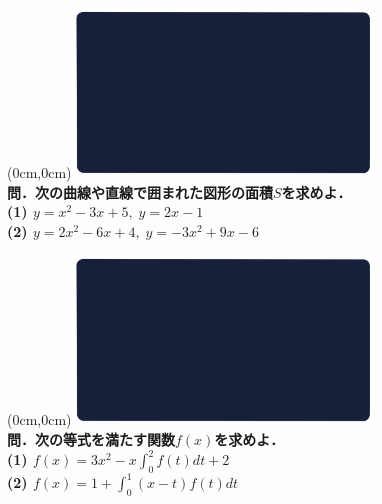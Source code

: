 \documentclass[10pt,
fleqn,
dvipdfmx,
uplatex
]{jsarticle}
\begin{document}
\newpage



\at(0cm,0cm){\includegraphics[width=8cm,bb=0 0 1920 1080]{./media_local/smart_background/数II微積.jpeg}}
\vspace{0.3zw}\\
\noindent\large 
\bf\boldmath 問．次の曲線や直線で囲まれた図形の面積$S$を求めよ．\\
(1)  $y=x^2-3x+5,\;y=2x-1$\\
(2)  $y=2x^2-6x+4,\;y=-3x^2+9x-6$\\



\newpage



\at(0cm,0cm){\includegraphics[width=8cm,bb=0 0 1920 1080]{./media_local/smart_background/数II微積.jpeg}}
\vspace{0.3zw}\\
\noindent\large 
\bf\boldmath 問．次の等式を満たす関数$f\left(x\right)$を求めよ．\\
(1)  $f\left(x\right)=3x^2-x\displaystyle\int_0^2f\left(t\right)dt+2$\\
(2)  $f\left(x\right)=1+\displaystyle\int_0^1\left(x-t\right)f\left(t\right)dt$\\



\newpage
\end{document}
